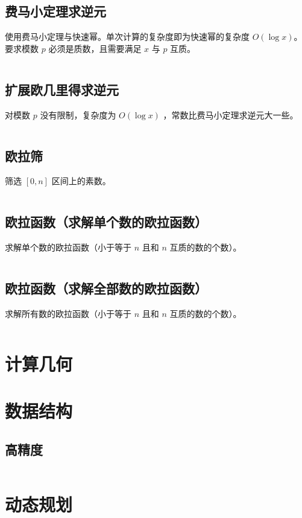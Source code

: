 \documentclass[a4paper, twoside]{article}
\begin{document}
    \subsection{费马小定理求逆元}
    使用费马小定理与快速幂。单次计算的复杂度即为快速幂的复杂度 $O(\log x)$。要求模数 $p$ 必须是质数，且需要满足 $x$ 与 $p$ 互质。
    \inputminted{cpp}{../src/数论/费马小定理求逆元.cpp}

    \subsection{扩展欧几里得求逆元}
    对模数 $p$ 没有限制，复杂度为 $O(\log x)$ ，常数比费马小定理求逆元大一些。
    \inputminted{cpp}{../src/数论/扩展欧几里得求逆元.cpp}

    \subsection{欧拉筛}
    筛选 $[0,n]$ 区间上的素数。
    \inputminted{cpp}{../src/数论/欧拉筛.cpp}

    \subsection{欧拉函数（求解单个数的欧拉函数）}
    求解单个数的欧拉函数（小于等于 $n$ 且和 $n$ 互质的数的个数）。
    \inputminted{cpp}{../src/数论/欧拉函数（求解单个数的欧拉函数）.cpp}

    \subsection{欧拉函数（求解全部数的欧拉函数）}
    求解所有数的欧拉函数（小于等于 $n$ 且和 $n$ 互质的数的个数）。
    \inputminted{cpp}{../src/数论/欧拉函数（求解全部数的欧拉函数）.cpp}

\newpage
\section{计算几何}

\newpage
\section{数据结构}
    \subsection{高精度}
    \inputminted{cpp}{../src/数据结构/高精度.cpp}

\newpage
\section{动态规划}
\end{document}
